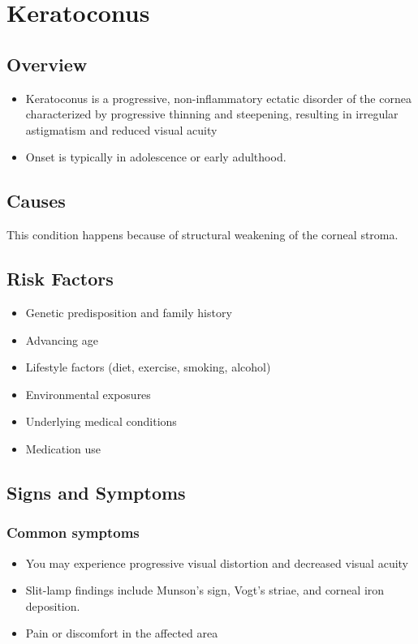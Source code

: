 \chapter{Keratoconus}
\label{sec:Keratoconus}

\section{Overview}


\begin{itemize}[noitemsep]
  \item Keratoconus is a progressive, non-inflammatory ectatic disorder of the cornea characterized by progressive thinning and steepening, resulting in irregular astigmatism and reduced visual acuity
  \item Onset is typically in adolescence or early adulthood.
\end{itemize}
\section{Causes}
This condition happens because of structural weakening of the corneal stroma.     
\section{Risk Factors}

\begin{itemize}[noitemsep]
  \item Genetic predisposition and family history
  \item Advancing age
  \item Lifestyle factors (diet, exercise, smoking, alcohol)
  \item Environmental exposures
  \item Underlying medical conditions
  \item Medication use
\end{itemize}
\section{Signs and Symptoms}

\subsection{Common symptoms}
\begin{itemize}[noitemsep]
  \item You may experience progressive visual distortion and decreased visual acuity
  \item Slit-lamp findings include Munson's sign, Vogt's striae, and corneal iron deposition.
  \item Pain or discomfort in the affected area
  \end{itemize}

